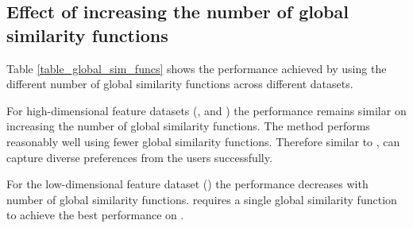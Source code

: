 \subsection{Effect of increasing the number of global similarity functions}


Table \ref{table_global_sim_funcs} shows the performance achieved by using 
the different number of global similarity functions across different datasets. 

For high-dimensional feature datasets (\CULEXP, \AMAZON and \BX) the 
performance remains similar on increasing the number of global similarity
functions. The \CF method performs reasonably well using fewer global similarity 
functions. Therefore similar to \CFLIN, \CF can capture  diverse preferences 
from the users successfully.

For the low-dimensional feature dataset (\MLHR) the performance decreases with
number of global similarity functions. \CF requires a single global similarity
function to achieve the best performance on \MLHR.




